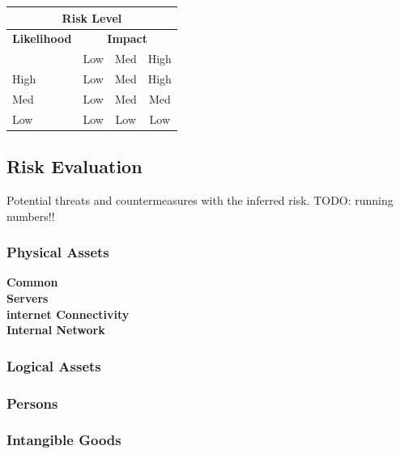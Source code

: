 \documentclass[english]{article}
\begin{document}
\vspace{5mm}

\begin{center}
\begin{tabular}{|l|c|c|c|}
\hline
\multicolumn{4}{|c|}{{\bf Risk Level}} \\
\hline
{{\bf Likelihood}} & \multicolumn{3}{c|}{{\bf Impact}} \\ %
     & Low & Med & High \\  \hline
 High & Low & Med & High  \\
\hline
 Med & Low & Med & Med \\
\hline
 Low & Low & Low & Low \\
\hline
\end{tabular}
\end{center}

\subsection{Risk Evaluation}


Potential threats and countermeasures with the inferred risk.
TODO: running numbers!!

\subsubsection{Physical Assets}
\textbf{Common} \\
\textbf{Servers} \\
\textbf{internet Connectivity} \\
\textbf{Internal Network} \\

\subsubsection{Logical Assets}



\subsubsection{Persons}
\subsubsection{Intangible Goods}
\end{document}
